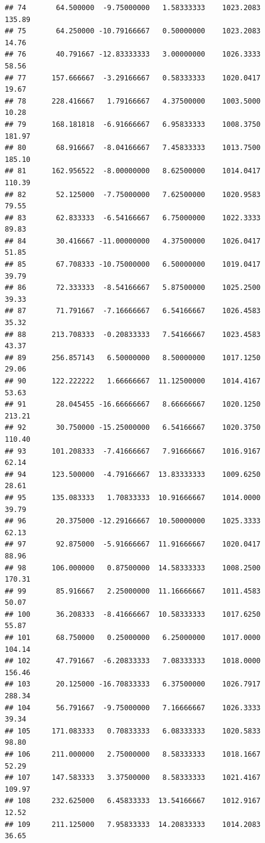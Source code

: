 \documentclass[
]{article}
\begin{document}
\begin{verbatim}
## 74       64.500000  -9.75000000   1.58333333    1023.2083      135.89
## 75       64.250000 -10.79166667   0.50000000    1023.2083       14.76
## 76       40.791667 -12.83333333   3.00000000    1026.3333       58.56
## 77      157.666667  -3.29166667   0.58333333    1020.0417       19.67
## 78      228.416667   1.79166667   4.37500000    1003.5000       10.28
## 79      168.181818  -6.91666667   6.95833333    1008.3750      181.97
## 80       68.916667  -8.04166667   7.45833333    1013.7500      185.10
## 81      162.956522  -8.00000000   8.62500000    1014.0417      110.39
## 82       52.125000  -7.75000000   7.62500000    1020.9583       79.55
## 83       62.833333  -6.54166667   6.75000000    1022.3333       89.83
## 84       30.416667 -11.00000000   4.37500000    1026.0417       51.85
## 85       67.708333 -10.75000000   6.50000000    1019.0417       39.79
## 86       72.333333  -8.54166667   5.87500000    1025.2500       39.33
## 87       71.791667  -7.16666667   6.54166667    1026.4583       35.32
## 88      213.708333  -0.20833333   7.54166667    1023.4583       43.37
## 89      256.857143   6.50000000   8.50000000    1017.1250       29.06
## 90      122.222222   1.66666667  11.12500000    1014.4167       53.63
## 91       28.045455 -16.66666667   8.66666667    1020.1250      213.21
## 92       30.750000 -15.25000000   6.54166667    1020.3750      110.40
## 93      101.208333  -7.41666667   7.91666667    1016.9167       62.14
## 94      123.500000  -4.79166667  13.83333333    1009.6250       28.61
## 95      135.083333   1.70833333  10.91666667    1014.0000       39.79
## 96       20.375000 -12.29166667  10.50000000    1025.3333       62.13
## 97       92.875000  -5.91666667  11.91666667    1020.0417       88.96
## 98      106.000000   0.87500000  14.58333333    1008.2500      170.31
## 99       85.916667   2.25000000  11.16666667    1011.4583       50.07
## 100      36.208333  -8.41666667  10.58333333    1017.6250       55.87
## 101      68.750000   0.25000000   6.25000000    1017.0000      104.14
## 102      47.791667  -6.20833333   7.08333333    1018.0000      156.46
## 103      20.125000 -16.70833333   6.37500000    1026.7917      288.34
## 104      56.791667  -9.75000000   7.16666667    1026.3333       39.34
## 105     171.083333   0.70833333   6.08333333    1020.5833       98.80
## 106     211.000000   2.75000000   8.58333333    1018.1667       52.29
## 107     147.583333   3.37500000   8.58333333    1021.4167      109.97
## 108     232.625000   6.45833333  13.54166667    1012.9167       12.52
## 109     211.125000   7.95833333  14.20833333    1014.2083       36.65

\end{verbatim}
\end{document}
